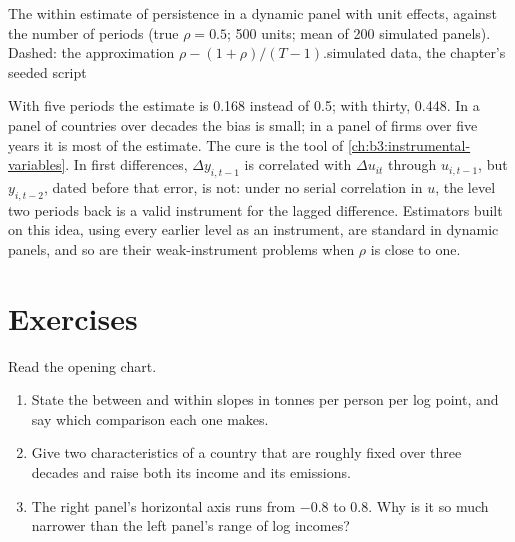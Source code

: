 \begin{omchart}{The within estimate of persistence in a dynamic panel with unit
effects, against the number of periods (true $\rho = 0.5$; 500 units; mean of
200 simulated panels). Dashed: the approximation $\rho - (1+\rho)/(T-1)$.}{simulated
data, the chapter's seeded script}
\end{omchart}

With five periods the estimate is 0.168 instead of 0.5; with thirty, 0.448.
In a panel of countries over decades the bias is small; in a panel of firms over
five years it is most of the estimate. The cure is the tool of
\cref{ch:b3:instrumental-variables}. In first differences, $\Delta y_{i,t-1}$ is
correlated with $\Delta u_{it}$ through $u_{i,t-1}$, but $y_{i,t-2}$, dated
before that error, is not: under no serial correlation in $u$, the level two
periods back is a valid instrument for the lagged difference. Estimators built
on this idea, using every earlier level as an instrument, are standard in
dynamic panels, and so are their weak-instrument problems when $\rho$ is close
to one.

\section{Exercises}\label{sec:b3:panel-data:exercises}

\begin{exercise}[$\star$]\label{exo:b3:panel-data:1}
Read the opening chart.
\begin{enumerate}
\item State the between and within slopes in tonnes per person per log point,
and say which comparison each one makes.
\item Give two characteristics of a country that are roughly fixed over three
decades and raise both its income and its emissions.
\item The right panel's horizontal axis runs from $-0.8$ to $0.8$. Why is it so
much narrower than the left panel's range of log incomes?
\end{enumerate}
\end{exercise}

